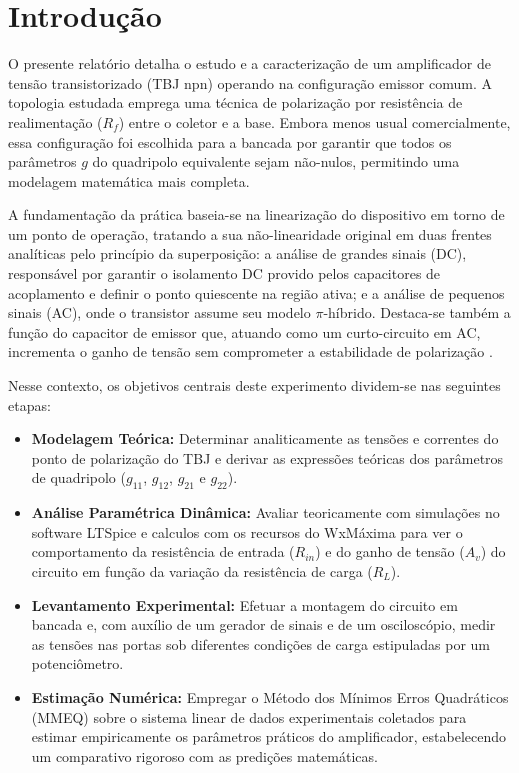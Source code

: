 \chapter{Introdução}

O presente relatório detalha o estudo e a caracterização de um amplificador de tensão transistorizado (TBJ npn) operando na configuração emissor comum. A topologia estudada emprega uma técnica de polarização por resistência de realimentação ($R_f$) entre o coletor e a base. Embora menos usual comercialmente, essa configuração foi escolhida para a bancada por garantir que todos os parâmetros $g$ do quadripolo equivalente sejam não-nulos, permitindo uma modelagem matemática mais completa.

A fundamentação da prática baseia-se na linearização do dispositivo em torno de um ponto de operação, tratando a sua não-linearidade original em duas frentes analíticas pelo princípio da superposição: a análise de grandes sinais (DC), responsável por garantir o isolamento DC provido pelos capacitores de acoplamento e definir o ponto quiescente na região ativa; e a análise de pequenos sinais (AC), onde o transistor assume seu modelo $\pi$-híbrido. Destaca-se também a função do capacitor de emissor que, atuando como um curto-circuito em AC, incrementa o ganho de tensão sem comprometer a estabilidade de polarização \cite{nilsson}.

Nesse contexto, os objetivos centrais deste experimento dividem-se nas seguintes etapas:
\begin{itemize}
	\item \textbf{Modelagem Teórica:} Determinar analiticamente as tensões e correntes do ponto de polarização do TBJ e derivar as expressões teóricas dos parâmetros de quadripolo ($g_{11}$, $g_{12}$, $g_{21}$ e $g_{22}$).
	\item \textbf{Análise Paramétrica Dinâmica:} Avaliar teoricamente com simulações no software LTSpice \cite{ltspice} e calculos com os recursos do WxMáxima  \cite{maxima} para ver o comportamento da resistência de entrada ($R_{in}$) e do ganho de tensão ($A_v$) do circuito em função da variação da resistência de carga ($R_L$).
	\item \textbf{Levantamento Experimental:} Efetuar a montagem do circuito em bancada e, com auxílio de um gerador de sinais e de um osciloscópio, medir as tensões nas portas sob diferentes condições de carga estipuladas por um potenciômetro.
	\item \textbf{Estimação Numérica:} Empregar o Método dos Mínimos Erros Quadráticos (MMEQ) sobre o sistema linear de dados experimentais coletados para estimar empiricamente os parâmetros práticos do amplificador, estabelecendo um comparativo rigoroso com as predições matemáticas.
\end{itemize}

